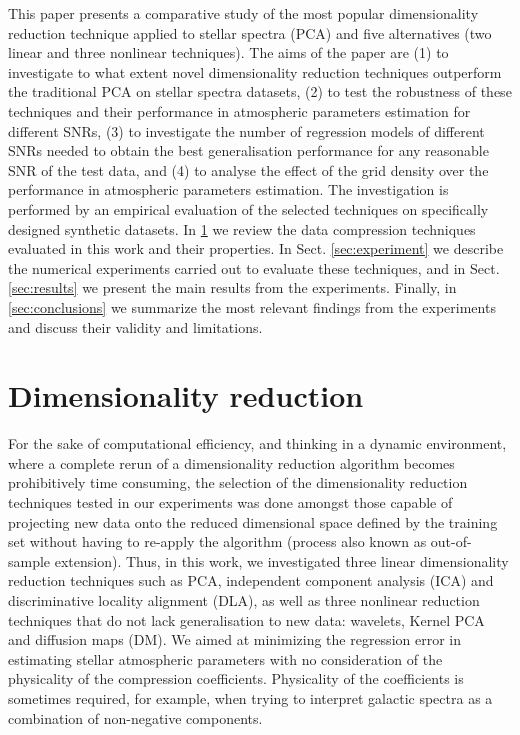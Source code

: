 \documentclass[a4paper,fleqn,usenatbib]{mnras}
\begin{document}
This paper presents a comparative study of the most popular
dimensionality reduction technique applied to stellar spectra (PCA)
and five alternatives (two linear and three nonlinear
techniques). The aims of the paper are (1) to investigate to what
extent novel dimensionality reduction techniques outperform the
traditional PCA on stellar spectra datasets, (2) to test the
robustness of these techniques and their performance in atmospheric
parameters estimation for different SNRs, (3) to investigate the
number of regression models of different SNRs needed to obtain the
best generalisation performance for any reasonable SNR of the test
data, and (4) to analyse the effect of the grid density over the 
performance in atmospheric parameters estimation.  
The investigation is performed by an empirical evaluation of
the selected techniques on specifically designed synthetic
datasets. In \ref{sec:dimred} we review the data compression
techniques evaluated in this work and their properties. In
Sect. \ref{sec:experiment} we describe the numerical experiments
carried out to evaluate these techniques, and in
Sect. \ref{sec:results} we present the main results from the
experiments. Finally, in \ref{sec:conclusions} we summarize the most
relevant findings from the experiments and discuss their validity
and limitations.

\section{Dimensionality reduction}
\label{sec:dimred}

For the sake of computational efficiency, and thinking in a 
dynamic environment, where a complete rerun of a dimensionality 
reduction algorithm becomes prohibitively time consuming, 
the selection of the dimensionality reduction techniques tested
  in our experiments was done amongst those capable of projecting new
  data onto the reduced dimensional space defined by the training set
  without having to re-apply the algorithm (process also known as 
  out-of-sample extension). Thus, in this work, we investigated three
linear dimensionality reduction techniques such as PCA, independent
component analysis (ICA) and discriminative locality alignment (DLA),
as well as three nonlinear reduction techniques that do not lack 
generalisation to new data: wavelets, Kernel PCA and diffusion maps (DM). 
We aimed at minimizing the regression
  error in estimating stellar atmospheric parameters with no
  consideration of the physicality of the compression
  coefficients. Physicality of the coefficients is sometimes
  required, for example, when trying to interpret galactic spectra as
  a combination of non-negative components.
\end{document}
